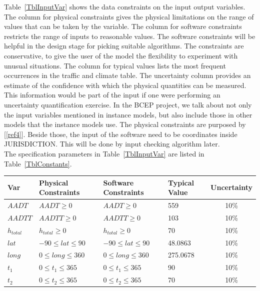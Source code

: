 \documentclass[12pt]{article}
\newcommand{\reref}[1]{\ref{#1}}
\begin{document}
Table~\ref{TblInputVar} shows the data constraints on the input output
variables. The column for physical constraints gives the physical limitations
on the range of values that can be taken by the variable. The column for
software constraints restricts the range of inputs to reasonable values. The software constraints will be helpful in the design stage for picking suitable
algorithms.  The constraints are conservative, to give the user of the model the
flexibility to experiment with unusual situations. The column for typical values lists the most frequent occurrences in the traffic and climate table. The uncertainty column
provides an estimate of the confidence with which the physical quantities can be measured. This information would be part of the input if one were performing an uncertainty quantification exercise. In the BCEP project, we talk about not only the input variables mentioned in instance models, but also include those in other models that the instance models use. The physical constraints are purposed by [\reref{ref4}]. Beside those, the input of the software need to be coordinates inside JURISDICTION. This will be done by input checking algorithm later. \\
The specification parameters in Table~\ref{TblInputVar} are listed in
Table~\ref{TblConstants}.

\begin{table}[!h]
  \caption{Input Variables} \label{TblInputVar}
  \renewcommand{\arraystretch}{1.2}
\noindent \begin{longtable*}{l l l l c} 
  \toprule
  \textbf{Var} & \textbf{Physical Constraints} & \textbf{Software Constraints} &
                             \textbf{Typical Value} & \textbf{Uncertainty}\\
  \midrule 
  $AADT$ & $AADT \ge 0$ & $AADT \ge 0$ & 559 & 10\%  \\
  $AADTT$ & $AADTT \ge 0$ & $AADTT \ge 0$ & 103  & 10\%
  \\
  $h_{total}$ & $h_{total} \ge 0$ & $h_{total} \ge 0$ &  70  & 10\%
  \\
  $lat$ & $-90 \leq lat \leq 90$ & $-90 \leq lat \leq 90$ & 48.0863 & 10\%
  \\
  $long$ & $0 \leq long \leq 360$ & $0 \leq long \leq 360$ &  275.0678 & 10\%
  \\
  $t_1$ & $0 \leq t_1 \leq 365$ & $0 \leq t_1 \leq 365$ &  90  & 10\%
  \\
  $t_2$ & $0 \leq t_2 \leq 365$ & $0 \leq t_2 \leq 365$ &  70  & 10\%
  \\
  \bottomrule
\end{longtable*}
\end{table}
\end{document}
